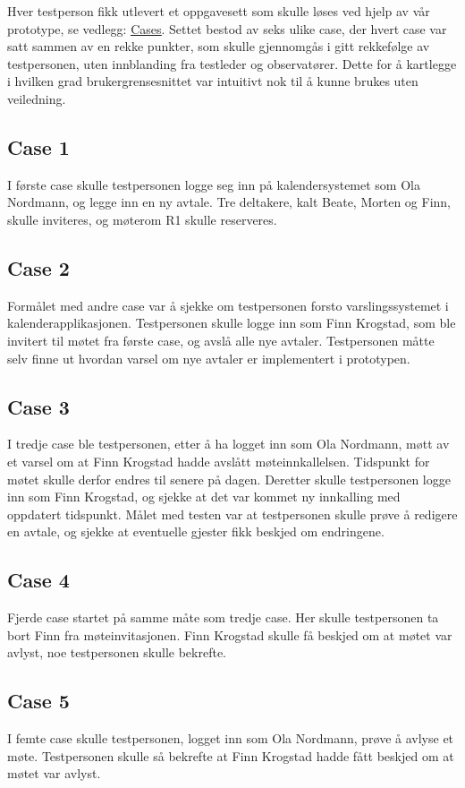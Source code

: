 Hver testperson fikk utlevert et oppgavesett som skulle løses ved hjelp av vår prototype, se vedlegg: \hyperlink{vedlegg/cases.pdf.1}{\underline{Cases}}. Settet bestod av seks ulike case, der hvert case var satt sammen av en rekke punkter, som skulle gjennomgås i gitt rekkefølge av testpersonen, uten innblanding fra testleder og observatører. Dette for å kartlegge i hvilken grad brukergrensesnittet var intuitivt nok til å kunne brukes uten veiledning.

\subsection{Case 1}
	I første case skulle testpersonen logge seg inn på kalendersystemet som Ola Nordmann, og legge inn en ny avtale. Tre deltakere, kalt Beate, Morten og Finn, skulle inviteres, og møterom R1 skulle reserveres.

\subsection{Case 2}
	Formålet med andre case var å sjekke om testpersonen forsto varslingssystemet i kalenderapplikasjonen. Testpersonen skulle logge inn som Finn Krogstad, som ble invitert til møtet fra første case, og avslå alle nye avtaler. Testpersonen måtte selv finne ut hvordan varsel om nye avtaler er implementert i prototypen.

\subsection{Case 3}
	I tredje case ble testpersonen, etter å ha logget inn som Ola Nordmann, møtt av et varsel om at Finn Krogstad hadde avslått møteinnkallelsen. Tidspunkt for møtet skulle derfor endres til senere på dagen. Deretter skulle testpersonen logge inn som Finn Krogstad, og sjekke at det var kommet ny innkalling med oppdatert tidspunkt. Målet med testen var at testpersonen skulle prøve å redigere en avtale, og sjekke at eventuelle gjester fikk beskjed om endringene.

\subsection{Case 4}
	Fjerde case startet på samme måte som tredje case. Her skulle testpersonen ta bort Finn fra møteinvitasjonen. Finn Krogstad skulle få beskjed om at møtet var avlyst, noe testpersonen skulle bekrefte.

\subsection{Case 5}
	I femte case skulle testpersonen, logget inn som Ola Nordmann, prøve å avlyse et møte. Testpersonen skulle så bekrefte at Finn Krogstad hadde fått beskjed om at møtet var avlyst.

